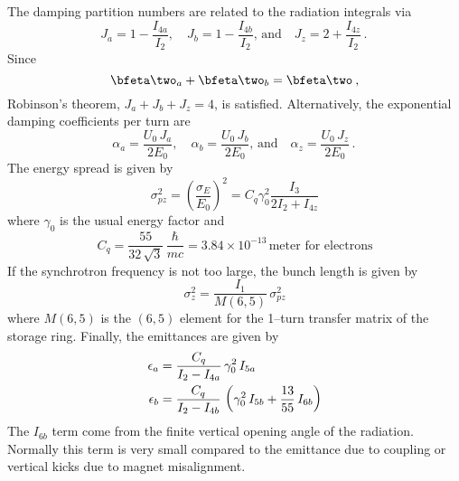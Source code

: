 The damping partition numbers are related to the radiation integrals via
  \begin{equation}
    J_a = 1 - \frac{I_{4a}}{I_2} \comma \quad
    J_b = 1 - \frac{I_{4b}}{I_2} \comma \, \text{and} \quad \label{j1ii}
    J_z = 2 + \frac{I_{4z}}{I_2} \period
  \end{equation}
Since 
  \begin{equation}          
    \bfeta\two_{a} + \bfeta\two_{b} = \bfeta\two
    \comma \label{eee}
  \end{equation}
Robinson's theorem, $J_a + J_b + J_z = 4$, is satisfied.
Alternatively, the exponential damping coefficients per turn are
  \begin{equation}
    \alpha_a = \frac{U_0 \, J_a}{2 E_0} \comma \quad
    \alpha_b = \frac{U_0 \, J_b}{2 E_0} \comma \, \text{and} \quad
    \alpha_z = \frac{U_0 \, J_z}{2 E_0} \period
  \end{equation}
The energy spread is given by
  \begin{equation}
    \sigma_{pz}^2 = \left( \frac{\sigma_E}{E_0} \right)^2 = 
    C_q \gamma_0^2 \frac{I_3}{2I_2 + I_{4z}}
  \end{equation}
where $\gamma_0$ is the usual energy factor and 
  \begin{equation}
    C_q = \frac{55}{32 \, \sqrt{3}} \, \frac{\hbar}{mc} = 
    3.84 \times 10^{-13} \, \text{meter for electrons}
  \end{equation}
If the synchrotron frequency is not too large, the bunch length is given by
  \begin{equation}
    \sigma_z^2 = \frac{I_1}{M(6,5)} \, \sigma_{pz}^2
  \end{equation}
where $M(6,5)$ is the $(6,5)$ element for the 1--turn transfer matrix
of the storage ring. Finally, the emittances are given by
  \begin{align}
    \epsilon_a &= \frac{C_q}{I_2 - I_{4a}} 
      \, \gamma_0^2 \, I_{5a} \nonumber \\
    \epsilon_b &= \frac{C_q}{I_2 - I_{4b}} 
      \, \left( \gamma_0^2 \, I_{5b} + \frac{13}{55} \, I_{6b} \right)
  \end{align}
The $I_{6b}$ term come from the finite vertical opening angle of the
radiation\cite{b:tol}. Normally this term is very small compared to
the emittance due to coupling or vertical kicks due to magnet misalignment.

